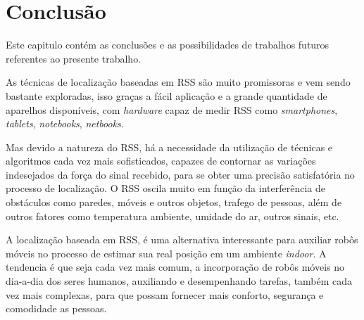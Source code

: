 \chapter{Conclusão}
\label{conclusao}
\begin{comment}
  Os robôs vem sendo muito utilizados na automatização de tarefas, e nesse trabalho 
  podemos perceber que  uma tarefa simples, como deslocar um robô de um lugar a outro, 
  de forma autônoma, exige técnicas complexas de estatística e de várias áreas da 
  computação como inteligência artificial, geometria computacional e processamento de 
  imagens.
  
    O conceito por trás desse trabalho é muito promissor, pois, a idéia de poder clicar em um mapa, ou falar o endereço onde você deseja ir,
    e seu celular ou tablet dirige seu carro para você, sem precisar tocar no volante, é extremamente interessante.
\end{comment}
    Este capitulo contém as conclusões e as possibilidades de trabalhos futuros referentes ao presente 
    trabalho.
  
   As técnicas de localização baseadas em RSS são muito promissoras e 
  vem sendo bastante exploradas, isso graças a fácil aplicação e a grande 
  quantidade de aparelhos disponíveis, 
  com \textit{hardware} capaz de medir RSS como \textit{smartphones}, \textit{tablets}, \textit{notebooks}, \textit{netbooks}.
  
   Mas devido a natureza do RSS, há a necessidade da utilização de técnicas e 
  algoritmos cada vez mais sofisticados, capazes de contornar as variações indesejados
  da força do sinal recebido, para se obter uma precisão satisfatória no processo de 
  localização. O RSS oscila muito em função da interferência 
   de obstáculos como paredes, 
   móveis e outros objetos, trafego de pessoas, além de outros fatores como temperatura ambiente, 
   umidade do ar, outros sinais, etc.
  
   A localização baseada em RSS, é uma alternativa interessante para auxiliar robôs móveis
   no processo de estimar sua real posição em um ambiente \textit{indoor}. A tendencia é que 
   seja cada vez mais comum, a incorporação de robôs móveis no dia-a-dia dos seres humanos,
   auxiliando e desempenhando tarefas, também cada vez mais complexas, para que possam 
   fornecer mais conforto, segurança e comodidade as pessoas.
   

